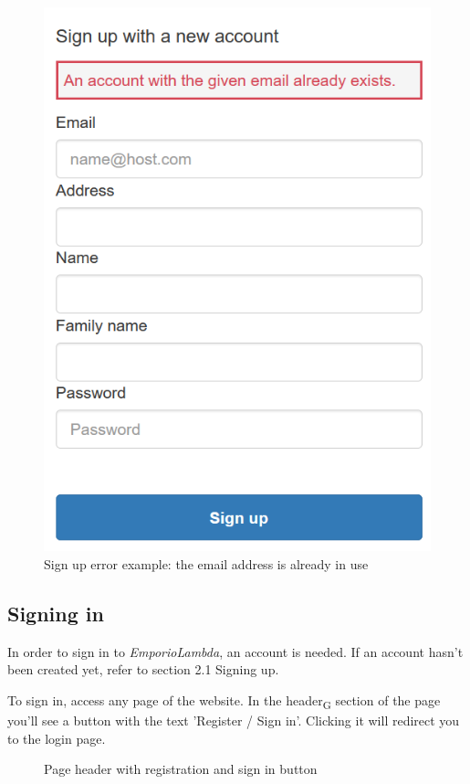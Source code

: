 \begin{figure}[H]
\centering
\includegraphics[scale=0.6]{res/Immagini/RegisterError}
\caption{Sign up error example: the email address is already in use}
\end{figure}

\subsection{Signing in}
In order to sign in to \textit{EmporioLambda}, an account is needed. If an account hasn't been created yet, refer to section 2.1 Signing up.

To sign in, access any page of the website. In the header\textsubscript{G} section of the page you'll see a button with the text 'Register / Sign in'. Clicking it will redirect you to the login page.

\begin{figure}[H]
%
\caption{Page header with registration and sign in button}
\end{figure}

